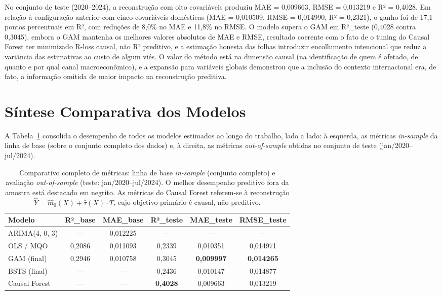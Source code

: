 \documentclass[	12pt, Times, openright, oneside, a4paper, english, brazil]{abntex2}
\begin{document}
No conjunto de teste (2020--2024), a reconstrução com oito covariáveis produziu MAE = 0{,}009663, RMSE = 0{,}013219 e R² = 0{,}4028. Em relação à configuração anterior com cinco covariáveis domésticas (MAE = 0{,}010509, RMSE = 0{,}014990, R² = 0{,}2321), o ganho foi de 17,1 pontos percentuais em R², com reduções de 8,0\% no MAE e 11,8\% no RMSE. O modelo supera o GAM em R²\_teste (0{,}4028 contra 0{,}3045), embora o GAM mantenha os melhores valores absolutos de MAE e RMSE, resultado coerente com o fato de o tuning do Causal Forest ter minimizado R-loss causal, não R² preditivo, e a estimação honesta das folhas introduzir encolhimento intencional que reduz a variância das estimativas ao custo de algum viés. O valor do método está na dimensão causal (na identificação de quem é afetado, de quanto e por qual canal macroeconômico), e a expansão para variáveis globais demonstrou que a inclusão do contexto internacional era, de fato, a informação omitida de maior impacto na reconstrução preditiva.

\section{Síntese Comparativa dos Modelos}\label{sec:sintese_modelos}

A Tabela~\ref{tab:metricas_split} consolida o desempenho de todos os modelos estimados ao longo do trabalho, lado a lado: à esquerda, as métricas \textit{in-sample} da linha de base (sobre o conjunto completo dos dados) e, à direita, as métricas \textit{out-of-sample} obtidas no conjunto de teste (jan/2020--jul/2024).

\begin{table}[ht!]
\centering
\begin{tabular}{|l|c|c|c|c|c|}
\hline
\textbf{Modelo} & \textbf{R²\_base} & \textbf{MAE\_base} & \textbf{R²\_teste} & \textbf{MAE\_teste} & \textbf{RMSE\_teste} \\ \hline
ARIMA(4, 0, 3) & ---      & 0{,}012225 & ---      & ---        & ---        \\ \hline
OLS / MQO      & 0{,}2086 & 0{,}011093 & 0{,}2339 & 0{,}010351 & 0{,}014971 \\ \hline
GAM (final)    & 0{,}2946 & 0{,}010758 & 0{,}3045 & \textbf{0{,}009997} & \textbf{0{,}014265} \\ \hline
BSTS (final)   & ---      & ---        & 0{,}2436 & 0{,}010147 & 0{,}014877 \\ \hline
Causal Forest  & ---      & ---        & \textbf{0{,}4028} & 0{,}009663 & 0{,}013219 \\ \hline
\end{tabular}
\caption{Comparativo completo de métricas: linha de base \textit{in-sample} (conjunto completo) e avaliação \textit{out-of-sample} (teste: jan/2020--jul/2024). O melhor desempenho preditivo fora da amostra está destacado em negrito. As métricas do Causal Forest referem-se à reconstrução $\hat{Y} = \hat{m}_0(X) + \hat{\tau}(X) \cdot T$, cujo objetivo primário é causal, não preditivo.}\label{tab:metricas_split}
\end{table}
\end{document}
